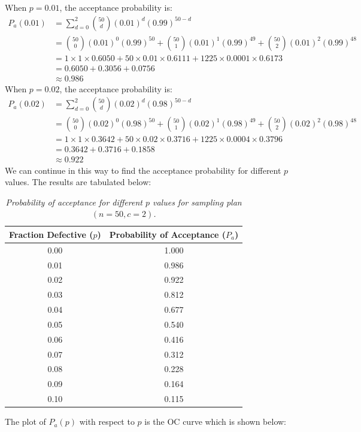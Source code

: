\documentclass[twoside]{book}
\begin{document}
When $p=0.01$, the acceptance probability is:
\begin{align*}
P_a(0.01)
&= \sum_{d=0}^{2} \binom{50}{d} (0.01)^d (0.99)^{50-d} \\[6pt]
&= \binom{50}{0}(0.01)^0(0.99)^{50}
   + \binom{50}{1}(0.01)^1(0.99)^{49}
   + \binom{50}{2}(0.01)^2(0.99)^{48} \\[6pt]
&= 1 \times 1 \times 0.6050
  + 50 \times 0.01 \times 0.6111
  + 1225 \times 0.0001 \times 0.6173 \\[6pt]
&= 0.6050 + 0.3056 + 0.0756 \\
&\approx 0.986
\end{align*}
When $p=0.02$, the acceptance probability is:
\begin{align*}
P_a(0.02)
&= \sum_{d=0}^{2} \binom{50}{d} (0.02)^d (0.98)^{50-d} \\[6pt]
&= \binom{50}{0}(0.02)^0(0.98)^{50}
   + \binom{50}{1}(0.02)^1(0.98)^{49}
   + \binom{50}{2}(0.02)^2(0.98)^{48} \\[6pt]
&= 1 \times 1 \times 0.3642
  + 50 \times 0.02 \times 0.3716
  + 1225 \times 0.0004 \times 0.3796 \\[6pt]
&= 0.3642 + 0.3716 + 0.1858 \\
&\approx 0.922
\end{align*}
We can continue in this way to find the acceptance probability for different $p$ values. The results are tabulated below:
\begin{table}[H]
\centering
\begin{tabular}{c|c}
\toprule
\textbf{Fraction Defective ($p$)} & \textbf{Probability of Acceptance} ($P_a$) \\
\midrule
0.00 & 1.000 \\
0.01 & 0.986 \\
0.02 & 0.922 \\
0.03 & 0.812 \\
0.04 & 0.677 \\
0.05 & 0.540 \\
0.06 & 0.416 \\
0.07 & 0.312 \\
0.08 & 0.228 \\
0.09 & 0.164 \\
0.10 & 0.115 \\
\bottomrule
\end{tabular}
\caption{\textit{Probability of acceptance for different $p$ values for sampling plan $(n=50, c=2)$.}}
\end{table}

The plot of $P_a(p)$ with respect to $p$ is the OC curve which is shown below:
\end{document}
